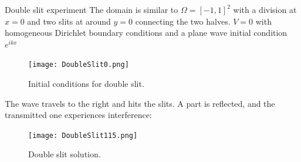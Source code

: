 \documentclass[final]{beamer}
\newlength{\onecolwid}
\newlength{\twocolwid}
\begin{document}
\begin{frame}[t]
\begin{columns}[t]
\begin{column}{\twocolwid}
\begin{columns}[t,totalwidth=\twocolwid]
\begin{column}{\onecolwid}
\begin{block}{Double slit experiment}
The domain is similar to $\Omega=[-1,1]^{2}$ with a division at $x=0$ and two slits at around $y=0$ connecting the two halves. $V=0$ with homogeneous Dirichlet boundary conditions and a plane wave initial condition $e^{ikx}$%
\begin{figure}[H]
\texttt{[image: DoubleSlit0.png]}
\caption{Initial conditions for double slit.}
\end{figure}
The wave travels to the right and hits the slits. A part is reflected, and the transmitted one experiences interference:
\begin{figure}[H]
	\texttt{[image: DoubleSlit115.png]}
	\caption{Double slit solution.}
\end{figure}
\end{block}


\end{column} %

\end{columns} %






\begin{columns}[t,totalwidth=\twocolwid] %




\end{columns}
\end{column}
\end{columns}
\end{frame}
\end{document}
